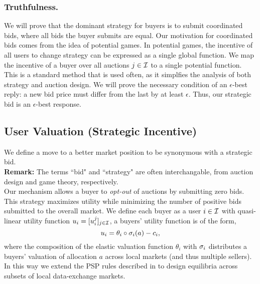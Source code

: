  
\subsubsection{Truthfulness.}
We will prove that the dominant strategy for buyers is to submit coordinated bids,
where all bids the buyer submits are equal. Our motivation for coordinated bids
comes from the idea of potential games. In potential games, the
incentive of all users to change strategy can be expressed as a single global
function. We map the incentive of a buyer over all auctions $j\in\mathcal{I}$ to a
single potential function. This is a standard method that is used often, as it
simplfies the analysis of both strategy and auction design. We will prove the necessary condition of an $\epsilon$-best
reply: a new bid price must differ from the last by at least $\epsilon$.
Thus, our strategic bid is an $\epsilon$-best response.

\subsection{User Valuation (Strategic Incentive)}

We define a move to a better market position to be synonymous with a
strategic bid. \\ 
\textbf{Remark:} The terms ``bid" and ``strategy" are often interchangable,
from auction design and game theory, respectively.\\
Our mechanism allows a buyer
to \emph{opt-out} of auctions by submitting zero bids. This strategy maximizes
utility while minimizing the number of positive bids submitted to the overall
market. 
We define each buyer as a user $i\in\mathcal{I}$ with quasi-linear utility
function $u_i = [u_i^j]_{j\in\mathcal{I}}$, a buyers' utility function is of the form,
\begin{equation}\label{buyerutility}
    u_i = \theta_i \circ \sigma_i(a) - c_i,
\end{equation}
where the composition of the elastic valuation function $\theta_i$ with $\sigma_i$
distributes a buyers' valuation of allocation $a$ across local markets (and thus
multiple sellers).
In this way we extend the PSP rules described
in \cite{semret} to design equilibria across subsets of local data-exchange markets.

